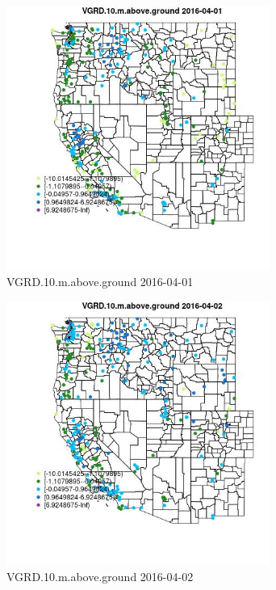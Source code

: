 \begin{figure} 
\centering  
\includegraphics[width=0.77\textwidth]{Code_Outputs/Report_ML_input_PM25_Step4_part_e_de_duplicated_aveswNAs_MapObsVGRD10maboveground2016-04-01.jpg} 
\caption{\label{fig:Report_ML_input_PM25_Step4_part_e_de_duplicated_aveswNAsMapObsVGRD10maboveground2016-04-01}VGRD.10.m.above.ground 2016-04-01} 
\end{figure} 
 

\begin{figure} 
\centering  
\includegraphics[width=0.77\textwidth]{Code_Outputs/Report_ML_input_PM25_Step4_part_e_de_duplicated_aveswNAs_MapObsVGRD10maboveground2016-04-02.jpg} 
\caption{\label{fig:Report_ML_input_PM25_Step4_part_e_de_duplicated_aveswNAsMapObsVGRD10maboveground2016-04-02}VGRD.10.m.above.ground 2016-04-02} 
\end{figure} 
 

